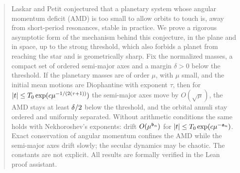 \begin{abstract}
Laskar and Petit conjectured that a planetary system whose angular momentum deficit (AMD) is too small to allow orbits to touch is, away from short-period resonances, stable in practice. We prove a rigorous asymptotic form of the mechanism behind this conjecture, in the plane and in space, up to the strong threshold, which also forbids a planet from reaching the star and is geometrically sharp. Fix the normalized masses, a compact set of ordered semi-major axes and a margin $\delta>0$ below the threshold. If the planetary masses are of order $\mu$, with $\mu$ small, and the initial mean motions are Diophantine with exponent $\tau$, then for $\abs{t}\leq T_0\exp(c\mu^{-\nf{1}{(2(\tau+1))}})$ the semi-major axes move by $O(\sqrt\mu)$, the AMD stays at least $\nf{\delta}{2}$ below the threshold, and the orbital annuli stay ordered and uniformly separated. Without arithmetic conditions the same holds with Nekhoroshev's exponents: drift $O(\mu^{\bE{}})$ for $\abs{t}\leq T_0\exp(c\mu^{-\aE{}})$. Exact conservation of angular momentum confines the AMD while the semi-major axes drift slowly; the secular dynamics may be chaotic. The constants are not explicit. All results are formally verified in the Lean proof assistant.
\end{abstract}
